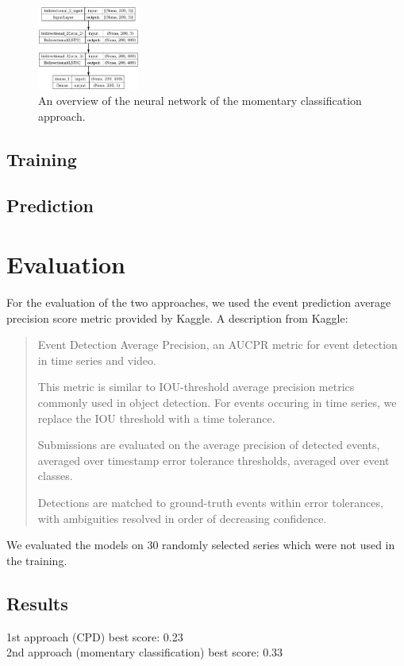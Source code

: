 \documentclass{article}
\begin{document}
\begin{figure}
    \label{fig:model-lstm}
    \centering
    \includegraphics[width=0.3\textwidth]{model_plot-2.png}
    \caption{An overview of the neural network of the momentary classification approach.}
\end{figure}

\subsection{Training}

\subsection{Prediction}

\section{Evaluation}

For the evaluation of the two approaches, we used the event prediction average precision score metric provided by Kaggle. A description from Kaggle:
\begin{quote}
    Event Detection Average Precision, an AUCPR metric for event detection in
    time series and video.

    This metric is similar to IOU-threshold average precision metrics commonly
    used in object detection. For events occuring in time series, we replace the
    IOU threshold with a time tolerance.

    Submissions are evaluated on the average precision of detected events,
    averaged over timestamp error tolerance thresholds, averaged over event
    classes.

    Detections are matched to ground-truth events within error tolerances, with
    ambiguities resolved in order of decreasing confidence.
\end{quote}

We evaluated the models on 30 randomly selected series which were not used in the training.

\subsection{Results}
1st approach (CPD) best score: 0.23\\
2nd approach (momentary classification) best score: 0.33
\end{document}
